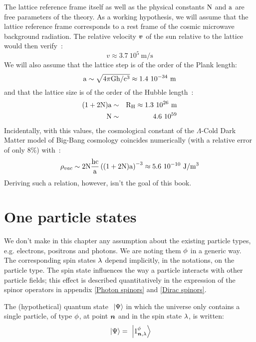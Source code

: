 The lattice reference frame itself as well as the physical constants $\N$ and $\a$ are free parameters of the theory. As a working hypothesis, we will assume that the lattice reference frame corresponds to a rest frame of the cosmic microwave background radiation. The relative velocity $\sv v$ of the sun relative to the lattice would then verify~\cite{Kogut1993}:
\begin{equation*}
v \approx 3.7~10^5\ \mathrm m / \mathrm s
\end{equation*}
We will also assume that the lattice step is of the order of the Plank length:
\begin{equation*}
\a \sim \sqrt{4\pi\G \h/\c^3}\approx1.4~10^{-34}\ \mathrm m
\end{equation*}
and that the lattice size is of the order of the Hubble length~\cite{Freedman2001}:
\begin{eqnarray*}
(1+2 \N) \a & \sim & \RH\approx1.3\ 10^{26}\ \mathrm m\\
\N & \sim & 4.6~10^{59}
\end{eqnarray*}
Incidentally, with this values, the cosmological constant of the $\Lambda$-Cold Dark Matter model of Big-Bang cosmology coincides numerically (with a relative error of only 8\%) with~\cite{Komatsu2010}:
\begin{equation*}
\rho_{vac} \sim 2 \N \frac{\h \c}{\a} \left( ( 1 + 2 \N ) \a \right)^{-3} \approx 5.6~10^{-10}\ \mathrm J / \mathrm m^3
\end{equation*}
Deriving such a relation, however, isn't the goal of this book.

\section{One particle states}

 We don't make in this chapter any assumption about the existing particle types, e.g. electrons, positrons and photons. We are noting them $\pt$ in a generic way. The corresponding spin states $\sp$ depend implicitly, in the notations, on the particle type. The spin state influences the way a particle interacts with other particle fields; this effect is described quantitatively in the expression of the spinor operators in appendix \ref{Photon spinors} and \ref{Dirac spinors}.

 The (hypothetical) quantum state $\ket{\Psi}$ in which the universe only contains a single particle, of type $\pt$, at point $\n$ and in the spin state $\sp$, is written:
\begin{equation*}
\ket{\Psi} = \ketX 1 \pt \n \sp
\end{equation*}

